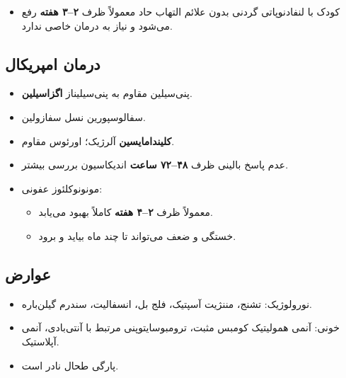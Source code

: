 \documentclass[12pt,a4paper]{article}
\begin{document}
\begin{itemize}
\item کودک با لنفادنوپاتی گردنی بدون علائم التهاب حاد
  \LymphArrow{} معمولاً ظرف \textbf{۲–۳ هفته} رفع می‌شود و نیاز به درمان خاصی ندارد.
\end{itemize}

\subsection*{درمان  امپریکال}
\begin{itemize}
\item پنی‌سیلین مقاوم به پنی‌سیلیناز \LymphArrow{} \textbf{اگزاسیلین}.
\item سفالوسپورین نسل  \LymphArrow{} سفازولین.
\item \textbf{کلیندامایسین} \LymphArrow{} آلرژیک؛  اورئوس مقاوم.
\item عدم پاسخ بالینی ظرف \textbf{۴۸–۷۲ ساعت}
  \LymphArrow{} اندیکاسیون بررسی بیشتر.
\end{itemize}

\clearpage
{}

\begin{itemize}
\item مونونوکلئوز عفونی:
  \begin{itemize}
  \item معمولاً ظرف \textbf{۲–۴ هفته} کاملاً بهبود می‌یابد.
  \item خستگی و ضعف می‌تواند تا چند ماه بیاید و برود.
  \end{itemize}
\end{itemize}

\subsection*{عوارض }
\begin{itemize}
\item نورولوژیک: تشنج، مننژیت آسپتیک، فلج بل، انسفالیت، سندرم گیلن‌باره.
\item خونی: آنمی همولیتیک کومبس مثبت، ترومبوسایتوپنی مرتبط با آنتی‌بادی، آنمی آپلاستیک.
\item پارگی طحال نادر است.
\end{itemize}

\clearpage
\end{document}

